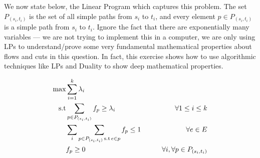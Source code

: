 \documentclass[solution,addpoints,12pt]{exam}
\begin{document}
\begin{questions}
We now state below, the Linear Program which captures this problem. The set $P_{(s_i,t_i)}$ is the set of all simple paths from $s_i$ to $t_i$, and every element $p \in P_{(s_i,t_i)}$ is a simple path from $s_i$ to $t_i$. Ignore the fact that there are exponentially many variables --- we are not trying to implement this in a computer, we are only using LPs to understand/prove some very fundamental mathematical properties about flows and cuts in this question. In fact, this exercise shows how to use algorithmic techniques like LPs and Duality to show deep mathematical properties.

\begin{alignat*}{2}
\max  & \sum_{i=1}^{k} \lambda_i \\
\text{s.t}  & \sum_{p \in P_{(s_i,t_i)}} f_p \geq \lambda_i & \qquad  \forall 1 \leq i \leq k  \\
  & \sum_{i} \sum_{p \in P_{(s_i,t_i)} \, {\rm s.t } \, e \in p} f_p  \leq 1 & \qquad \forall e \in E \\
  & f_p \geq 0 & \qquad \forall i, \forall p \in P_{(s_i,t_i)}
\end{alignat*}

\end{questions}
\end{document}
